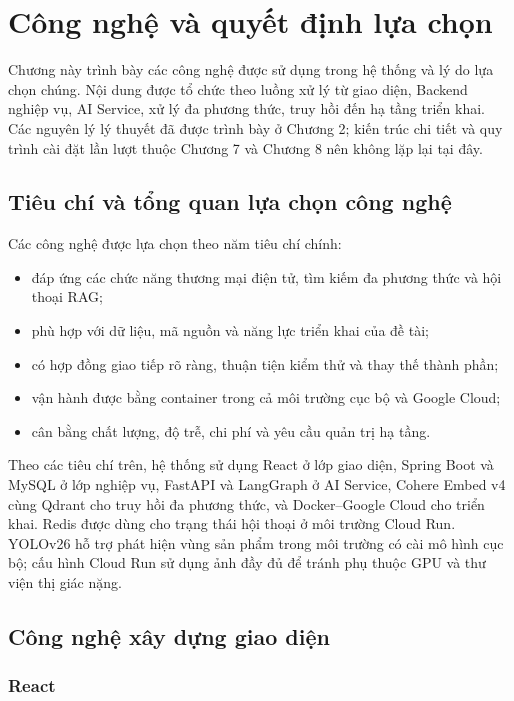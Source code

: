 \section{Công nghệ và quyết định lựa chọn}

Chương này trình bày các công nghệ được sử dụng trong hệ thống và lý do lựa chọn chúng. Nội dung được tổ chức theo luồng xử lý từ giao diện, Backend nghiệp vụ, AI Service, xử lý đa phương thức, truy hồi đến hạ tầng triển khai. Các nguyên lý lý thuyết đã được trình bày ở Chương 2; kiến trúc chi tiết và quy trình cài đặt lần lượt thuộc Chương 7 và Chương 8 nên không lặp lại tại đây.

\subsection{Tiêu chí và tổng quan lựa chọn công nghệ}

Các công nghệ được lựa chọn theo năm tiêu chí chính:

\begin{itemize}
    \item đáp ứng các chức năng thương mại điện tử, tìm kiếm đa phương thức và hội thoại RAG;
    \item phù hợp với dữ liệu, mã nguồn và năng lực triển khai của đề tài;
    \item có hợp đồng giao tiếp rõ ràng, thuận tiện kiểm thử và thay thế thành phần;
    \item vận hành được bằng container trong cả môi trường cục bộ và Google Cloud;
    \item cân bằng chất lượng, độ trễ, chi phí và yêu cầu quản trị hạ tầng.
\end{itemize}

Theo các tiêu chí trên, hệ thống sử dụng React ở lớp giao diện, Spring Boot và MySQL ở lớp nghiệp vụ, FastAPI và LangGraph ở AI Service, Cohere Embed v4 cùng Qdrant cho truy hồi đa phương thức, và Docker--Google Cloud cho triển khai. Redis được dùng cho trạng thái hội thoại ở môi trường Cloud Run. YOLOv26 hỗ trợ phát hiện vùng sản phẩm trong môi trường có cài mô hình cục bộ; cấu hình Cloud Run sử dụng ảnh đầy đủ để tránh phụ thuộc GPU và thư viện thị giác nặng.

\subsection{Công nghệ xây dựng giao diện}

\subsubsection{React}

